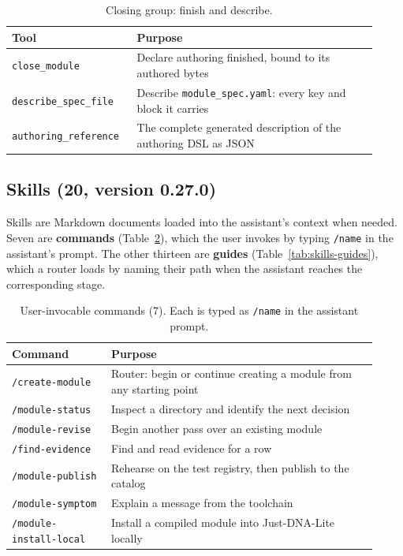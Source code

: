 \documentclass[11pt,a4paper]{article}
\begin{document}
\begin{table}[ht]
\centering
\scriptsize
\caption{Closing group: finish and describe.}
\label{tab:tools-closing}
\begin{tabular}{@{}p{0.30\linewidth}p{0.62\linewidth}@{}}
\toprule
Tool & Purpose \\
\midrule
\texttt{close\_module}        & Declare authoring finished, bound to its authored bytes \\
\texttt{describe\_spec\_file} & Describe \texttt{module\_spec.yaml}: every key and block it carries \\
\texttt{authoring\_reference} & The complete generated description of the authoring DSL as JSON \\
\bottomrule
\end{tabular}
\end{table}

\subsection*{Skills (20, version 0.27.0)}

Skills are Markdown documents loaded into the assistant's context when
needed. Seven are \textbf{commands} (Table~\ref{tab:skills-commands}), which the user invokes by typing \texttt{/name} in
the assistant's prompt. The other thirteen are \textbf{guides} (Table~\ref{tab:skills-guides}), which a router
loads by naming their path when the assistant reaches the corresponding
stage.

\begin{table}[ht]
\centering
\scriptsize
\caption{User-invocable commands (7). Each is typed as
\texttt{/name} in the assistant prompt.}
\label{tab:skills-commands}
\begin{tabular}{@{}p{0.25\linewidth}p{0.67\linewidth}@{}}
\toprule
Command & Purpose \\
\midrule
\texttt{/create-module}         & Router: begin or continue creating a module from any starting point \\
\texttt{/module-status}         & Inspect a directory and identify the next decision \\
\texttt{/module-revise}         & Begin another pass over an existing module \\
\texttt{/find-evidence}         & Find and read evidence for a row \\
\texttt{/module-publish}        & Rehearse on the test registry, then publish to the catalog \\
\texttt{/module-symptom}        & Explain a message from the toolchain \\
\texttt{/module-install-local}  & Install a compiled module into Just-DNA-Lite locally \\
\bottomrule
\end{tabular}
\end{table}
\end{document}
